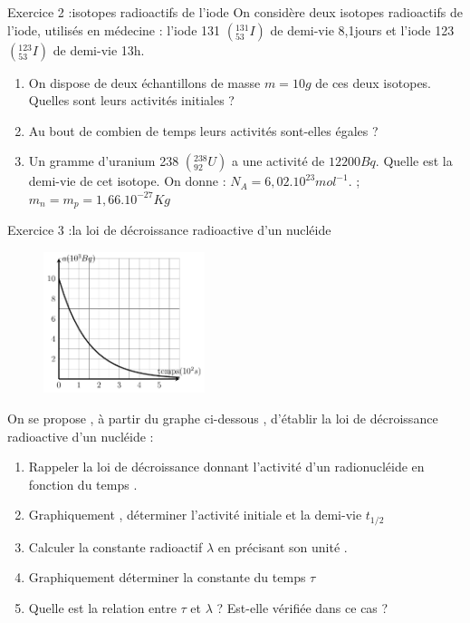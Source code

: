 \documentclass[12pt, french]{article}
\begin{document}
\begin{Box2}{Exercice 2 :isotopes radioactifs de l’iode }
On considère deux isotopes radioactifs de l’iode, utilisés en médecine : l’iode 131 $(_{53}^{131}I)$ de demi-vie 8,1jours et l’iode 123  $(_{53}^{123}I)$ de demi-vie 13h.
\begin{enumerate}
	\item  On dispose de deux échantillons de masse $m = 10g$ de ces deux isotopes. Quelles sont leurs activités initiales ?
	\item  Au bout de combien de temps leurs activités sont-elles égales ?
	\item Un gramme d’uranium 238 $(_{92}^{238}U)$ a une activité de $12200Bq$. Quelle est la demi-vie de cet isotope.
		On donne : $N_A=6,02.10^{23}mol^{-1}.$ ; $m_n = m_p = 1,66.10^{-27}Kg$
\end{enumerate}
\end{Box2}


\begin{Box2}{Exercice 3 :la loi de décroissance radioactive d’un nucléide }
\begin{figure}
  \begin{center}
	  \vspace{-0.6cm}
	\includegraphics[width=0.42\textwidth]{./img/courbe1.png}
  \end{center}
\end{figure}
On se propose , à partir du graphe ci-dessous , d’établir la loi de décroissance radioactive d’un nucléide :

\begin{enumerate}
	\item Rappeler la loi de décroissance donnant l’activité d’un radionucléide en fonction du
temps .
\item Graphiquement , déterminer l’activité initiale et la demi-vie $t_{1/2}$
\item Calculer la constante radioactif $\lambda$ en précisant son unité .
\item Graphiquement déterminer la constante du temps $\tau$
\item Quelle est la relation entre $\tau$ et $\lambda$ ? Est-elle vérifiée dans ce cas ?
\end{enumerate}
\end{Box2}
\end{document}
